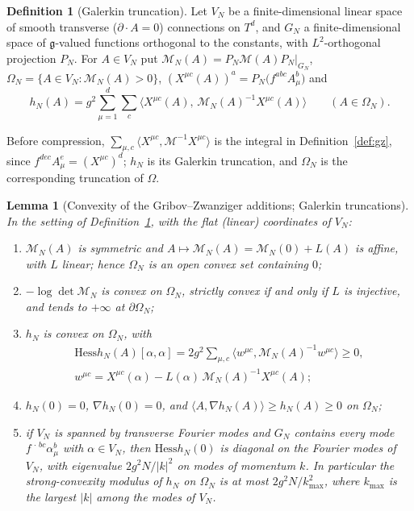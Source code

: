 \documentclass[11pt,a4paper]{amsart}
\newtheorem{lemma}[theorem]{Lemma}
\theoremstyle{definition}
\newtheorem{definition}[theorem]{Definition}
\newcommand{\Hess}{\mathrm{Hess}}
\begin{document}
\begin{definition}[Galerkin truncation]
\label{def:galerkin}
Let $V_N$ be a finite-dimensional linear space of smooth transverse ($\partial\cdot A = 0$) connections on $T^d$, and $G_N$ a finite-dimensional space of $\mathfrak{g}$-valued functions orthogonal to the constants, with $L^2$-orthogonal projection $P_N$. For $A \in V_N$ put $\mathcal{M}_N(A) = P_N\mathcal{M}(A)P_N|_{G_N}$, $\Omega_N = \{A \in V_N : \mathcal{M}_N(A) > 0\}$, $(X^{\mu c}(A))^a = P_N\big(f^{abc}A^b_\mu\big)$ and
\begin{equation*}
    h_N(A) = g^2\sum_{\mu=1}^{d}\sum_{c}\big\langle X^{\mu c}(A),\, \mathcal{M}_N(A)^{-1}X^{\mu c}(A)\big\rangle \qquad (A \in \Omega_N).
\end{equation*}
\end{definition}

Before compression, $\sum_{\mu,c}\langle X^{\mu c},\mathcal{M}^{-1}X^{\mu c}\rangle$ is the integral in Definition~\ref{def:gz}, since $f^{dec}A^e_\mu = (X^{\mu c})^d$; $h_N$ is its Galerkin truncation, and $\Omega_N$ is the corresponding truncation of $\Omega$.

\begin{lemma}[Convexity of the Gribov--Zwanziger additions; Galerkin truncations]
\label{lem:gz_convex}
In the setting of Definition~\ref{def:galerkin}, with the flat (linear) coordinates of $V_N$:
\begin{enumerate}[label=(\alph*)]
    \item $\mathcal{M}_N(A)$ is symmetric and $A \mapsto \mathcal{M}_N(A) = \mathcal{M}_N(0) + L(A)$ is affine, with $L$ linear; hence $\Omega_N$ is an open convex set containing $0$;
    \item $-\log\det\mathcal{M}_N$ is convex on $\Omega_N$, strictly convex if and only if $L$ is injective, and tends to $+\infty$ at $\partial\Omega_N$;
    \item $h_N$ is convex on $\Omega_N$, with
    \begin{gather*}
        \Hess h_N(A)[\alpha,\alpha] = 2g^2\sum_{\mu,c}\big\langle w^{\mu c}, \mathcal{M}_N(A)^{-1}w^{\mu c}\big\rangle \ge 0, \\
        w^{\mu c} = X^{\mu c}(\alpha) - L(\alpha)\,\mathcal{M}_N(A)^{-1}X^{\mu c}(A);
    \end{gather*}
    \item $h_N(0) = 0$, $\nabla h_N(0) = 0$, and $\langle A, \nabla h_N(A)\rangle \ge h_N(A) \ge 0$ on $\Omega_N$;
    \item if $V_N$ is spanned by transverse Fourier modes and $G_N$ contains every mode $f^{\,\cdot\,bc}\alpha^b_\mu$ with $\alpha \in V_N$, then $\Hess h_N(0)$ is diagonal on the Fourier modes of $V_N$, with eigenvalue $2g^2N/|k|^2$ on modes of momentum $k$. In particular the strong-convexity modulus of $h_N$ on $\Omega_N$ is at most $2g^2N/k_{\max}^2$, where $k_{\max}$ is the largest $|k|$ among the modes of $V_N$.
\end{enumerate}
\end{lemma}
\end{document}
